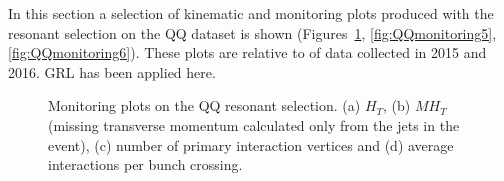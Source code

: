In this section a selection of kinematic and monitoring plots produced with the resonant selection on the QQ dataset is shown 
(Figures~\ref{fig:QQmonitoring1},  
\ref{fig:QQmonitoring5}, \ref{fig:QQmonitoring6}). These plots are relative to \integLumi of data collected in 2015 and 2016.
 GRL has been applied here.

\begin{figure}[htb]
 \centering

 \caption{Monitoring plots on %
 the QQ resonant selection. (a) $H_T$, (b) $MH_T$ (missing transverse momentum calculated only from the jets in the event), (c) number of primary interaction vertices and (d) average interactions per bunch crossing.}
 \label{fig:QQmonitoring1}
\end{figure}

